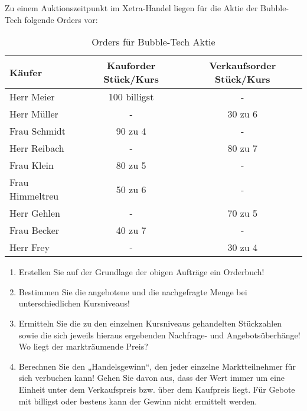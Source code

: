 Zu einem Auktionszeitpunkt im Xetra-Handel liegen für die Aktie der Bubble-Tech folgende Orders vor:

\begin{table}[h!]
    \centering
    \begin{tabular}{|l|c|c|}
        \hline
        \textbf{Käufer} & \textbf{Kauforder Stück/Kurs} & \textbf{Verkaufsorder Stück/Kurs} \\
        \hline
        Herr Meier & 100 billigst & - \\
        Herr Müller & - & 30 zu 6 \\
        Frau Schmidt & 90 zu 4 & - \\
        Herr Reibach & - & 80 zu 7 \\
        Frau Klein & 80 zu 5 & - \\
        Frau Himmeltreu & 50 zu 6 & - \\
        Herr Gehlen & - & 70 zu 5 \\
        Frau Becker & 40 zu 7 & - \\
        Herr Frey & - & 30 zu 4 \\
        \hline
    \end{tabular}
    \caption{Orders für Bubble-Tech Aktie}
    \label{tab:orders_bubble_tech}
\end{table}

\begin{enumerate}[label=(\alph*)]
    \item Erstellen Sie auf der Grundlage der obigen Aufträge ein Orderbuch!
    \item Bestimmen Sie die angebotene und die nachgefragte Menge bei unterschiedlichen Kursniveaus!
    \item Ermitteln Sie die zu den einzelnen Kursniveaus gehandelten Stückzahlen sowie die sich jeweils hieraus ergebenden Nachfrage- und Angebotsüberhänge! Wo liegt der markträumende Preis?
    \item Berechnen Sie den „Handelsgewinn“, den jeder einzelne Marktteilnehmer für sich verbuchen kann! Gehen Sie davon aus, dass der Wert immer um eine Einheit unter dem Verkaufspreis bzw. über dem Kaufpreis liegt. Für Gebote mit billigst oder bestens kann der Gewinn nicht ermittelt werden.
\end{enumerate}

